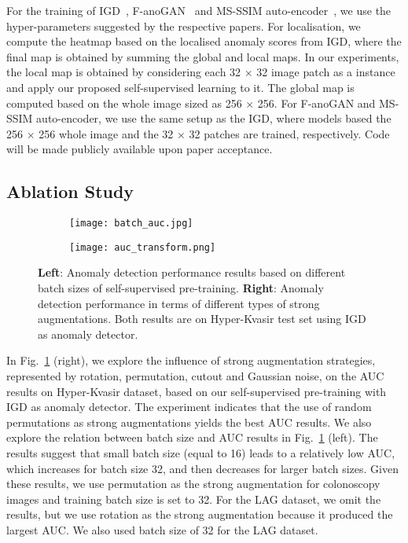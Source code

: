 \documentclass[runningheads]{llncs}
\begin{document}
For the training of IGD~\cite{chen2021unsupervised}, F-anoGAN~\cite{F-anoGAN} and MS-SSIM auto-encoder~\cite{chen2021unsupervised}, we use the hyper-parameters suggested by the respective papers. 
For localisation, we compute the heatmap based on the localised anomaly scores from IGD, where the final map is obtained by summing the global and local maps. 
In our experiments, the local map is obtained by considering each 32 $\times$ 32 image patch as a instance and apply our proposed self-supervised learning to it. The global map is computed based on the whole image sized as 256 $\times$ 256. For F-anoGAN and MS-SSIM auto-encoder, we use the same setup as the IGD, where models based the 256 $\times$ 256 whole image and the 32 $\times$ 32 patches are trained, respectively.
Code will be made publicly available upon paper acceptance. 



\subsection{Ablation Study}



\begin{figure}[t]
\begin{subfigure}{.5\textwidth}
\centering
  \texttt{[image: batch\_auc.jpg]}
\end{subfigure}\begin{subfigure}{.5\textwidth}
\centering
\texttt{[image: auc\_transform.png]}
\end{subfigure}\caption{\textbf{Left}: Anomaly detection performance results based on different batch sizes of self-supervised pre-training. \textbf{Right}: Anomaly detection performance in terms of different types of strong augmentations. Both results are on Hyper-Kvasir test set using IGD as anomaly detector. }
\label{fig:batch_transform_results}
\end{figure}

In Fig.~\ref{fig:batch_transform_results} (right), we explore the influence of strong augmentation strategies, represented by  rotation, permutation, cutout and Gaussian noise, on the AUC results on Hyper-Kvasir dataset, based on our self-supervised pre-training with IGD as anomaly detector. 
The experiment indicates that the use of random permutations as strong augmentations yields the best AUC results. 
We also explore the relation between batch size and AUC results in Fig.~\ref{fig:batch_transform_results} (left). The results suggest that 
small batch size (equal to 16) leads to a relatively low AUC, which increases for batch size 32, and then decreases for larger batch sizes.
Given these results, we use permutation as the strong augmentation for colonoscopy images and training batch size is set to 32.
For the LAG dataset, we omit the results, but we use rotation as the strong augmentation because it produced the largest AUC. We also used batch size of 32 for the LAG dataset.
\end{document}
